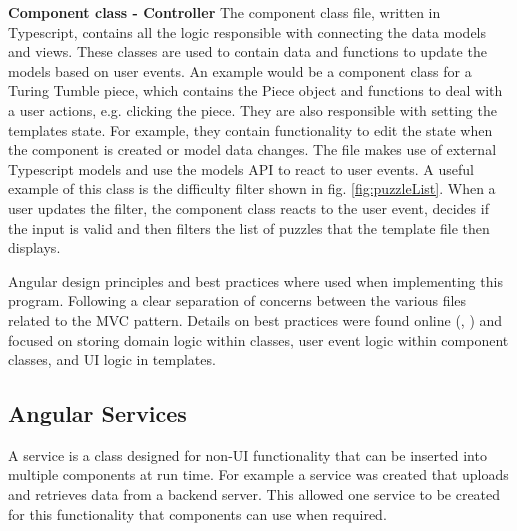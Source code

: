 \documentclass{l4proj}
\begin{document}

\textbf{Component class - Controller}
The component class file, written in Typescript, contains all the logic responsible with connecting the data models and views. These classes are used to contain data and functions to update the models based on user events.  An example would be a component class for a Turing Tumble piece, which contains the Piece object and functions to deal with a user actions, e.g. clicking the piece. They are also responsible with setting the templates state. For example, they contain functionality to edit the state when the component is created or model data changes. The file makes use of external Typescript models and use the models API to react to user events. A useful example of this class is the difficulty filter shown in fig. \ref{fig:puzzleList}. When a user updates the filter, the component class reacts to the user event, decides if the input is valid and then filters the list of puzzles that the template file then displays.

Angular design principles and best practices where used when implementing this program. Following a clear separation of concerns between the various files related to the MVC pattern. Details on best practices were found online (\cite{angular_practices}, \cite{freeman_pro_2017}) and focused on storing domain logic within classes, user event logic within component classes, and UI logic in templates.

\subsection{Angular Services}
A service is a class designed for non-UI functionality that can be inserted into multiple components at run time. For example a service was created that uploads and retrieves data from a backend server. This allowed one service to be created for this functionality that components can use when required. 
\end{document}
